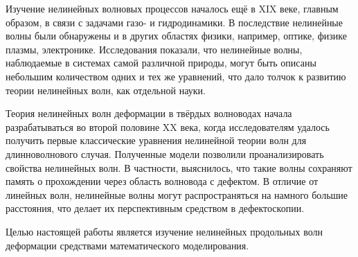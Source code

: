 \documentclass[12pt, a4paper]{report}
\begin{document}
Изучение нелинейных волновых процессов началось ещё в XIX веке, главным образом, в связи с задачами газо- и гидродинамики. В последствие нелинейные волны были обнаружены и в других областях физики, например, оптике, физике плазмы, электронике. Исследования показали, что нелинейные волны, наблюдаемые в системах самой различной природы, могут быть описаны небольшим количеством одних и тех же уравнений, что дало толчок к развитию теории нелинейных волн, как отдельной науки.

Теория нелинейных волн деформации в твёрдых волноводах начала разрабатываться во второй половине XX века, когда исследователям удалось получить первые классические уравнения нелинейной теории волн для длинноволнового случая. Полученные модели позволили проанализировать свойства нелинейных волн. В частности, выяснилось, что такие волны сохраняют память о прохождении через область волновода с дефектом. В отличие от линейных волн, нелинейные волны могут распространяться на намного большие расстояния, что делает их перспективным средством в дефектоскопии. 

Целью настоящей работы является изучение нелинейных продольных волн деформации средствами математического моделирования.

\end{document}
